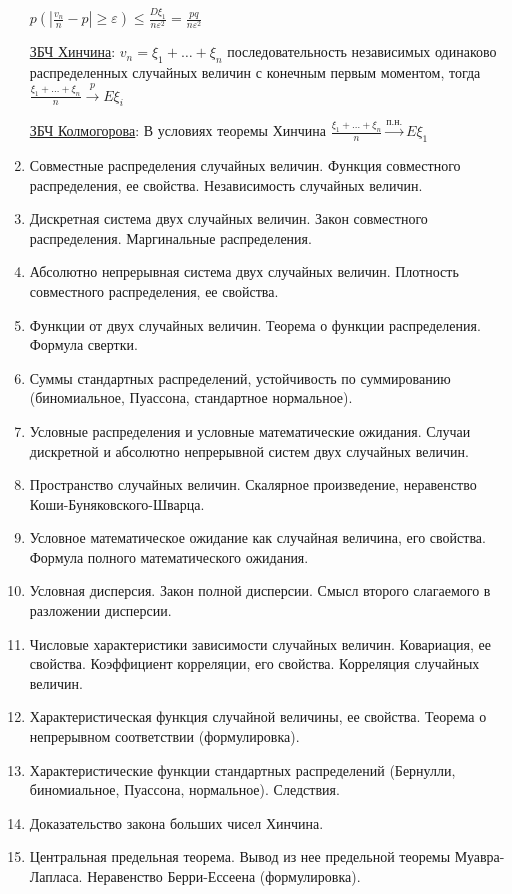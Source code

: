\begin{enumerate}
\begin{MyProof}
        $p\left(\left|\frac{v_n}{n} - p\right| \geq \varepsilon\right) \leq \frac{D\xi_1}{n\varepsilon^2} = \frac{pq}{n\varepsilon^2}$
    \end{MyProof}

    \hyperlink{lawofbignumberskhinchin}{ЗБЧ Хинчина}: \Ths $v_n = \xi_1 + \dots + \xi_n$ последовательность независимых одинаково распределенных случайных величин с конечным первым моментом, тогда
    $\frac{\xi_1 + \dots + \xi_n}{n} \overset{p}{\longrightarrow} E\xi_i$

    \hyperlink{lawofbignumberskolmogorov}{ЗБЧ Колмогорова}: В условиях теоремы Хинчина $\frac{\xi_1 + \dots + \xi_n}{n} \overset{\text{п.н.}}{\longrightarrow} E\xi_1$

    \item Совместные распределения случайных величин. Функция совместного распределения, ее свойства. Независимость случайных величин.
    \item Дискретная система двух случайных величин. Закон совместного распределения. Маргинальные распределения.
    \item Абсолютно непрерывная система двух случайных величин. Плотность совместного распределения, ее свойства.
    \item Функции от двух случайных величин. Теорема о функции распределения. Формула свертки.
    \item Суммы стандартных распределений, устойчивость по суммированию (биномиальное, Пуассона, стандартное нормальное).
    \item Условные распределения и условные математические ожидания. Случаи дискретной и абсолютно непрерывной систем двух случайных величин.
    \item Пространство случайных величин. Скалярное произведение, неравенство Коши-Буняковского-Шварца. 
    \item Условное математическое ожидание как случайная величина, его свойства. Формула полного математического ожидания.
    \item Условная дисперсия. Закон полной дисперсии. Смысл второго слагаемого в разложении дисперсии.
    \item Числовые характеристики зависимости случайных величин. Ковариация, ее свойства. Коэффициент корреляции, его свойства. Корреляция случайных величин.
    \item Характеристическая функция случайной величины, ее свойства. Теорема о непрерывном соответствии (формулировка).
    \item Характеристические функции стандартных распределений (Бернулли, биномиальное, Пуассона, нормальное). Следствия.
    \item Доказательство закона больших чисел Хинчина.
    \item Центральная предельная теорема. Вывод из нее предельной теоремы Муавра-Лапласа. Неравенство Берри-Ессеена (формулировка). 


\end{enumerate}
